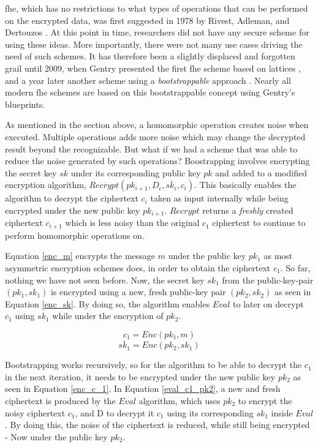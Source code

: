\Gls{fhe}, which has no restrictions to what types of operations that can be performed on the encrypted data, was first suggested in 1978 by Rivest, Adleman, and Dertouzos \cite{rivest1978data}. At this point in time, researchers did not have any secure scheme for using these ideas. More importantly, there were not many use cases driving the need of such schemes. It has therefore been a slightly displaced and forgotten grail until 2009,
when Gentry presented the first \gls{fhe} scheme based on lattices \cite{Gentry_first_lattices}, and a year later another scheme using a \emph{bootstrappable} approach \citep{Gentry_computing_arb_func_enc_data}. Nearly all modern \gls{fhe} schemes are based on this bootstrappable concept using Gentry's blueprints. 

As mentioned in the section above, a homomorphic operation creates noise when executed. Multiple operations adds more noise which may change the decrypted result beyond the recognizable. But what if we had a scheme that was able to reduce the noise generated by such operations? Boostrapping involves encrypting the secret key $sk$ under its corresponding public key $pk$ and added to a modified encryption algorithm, $Recrypt(pk_{i+1}, D_{\epsilon}, \overline{sk_i}, c_i)$. This basically enables the algorithm to decrypt the ciphertext $c_i$ taken as input internally while being encrypted under the new public key $pk_{i+1}$. $Recrypt$ returns a \emph{freshly} created ciphertext $c_{i+1}$ which is less noisy than the original $c_1$ ciphertext to continue to perform homomorphic operations on.

Equation \ref{enc_m} encrypts the message $m$ under the public key $pk_1$ as most asymmetric encryption schemes does, in order to obtain the ciphertext $c_1$. So far, nothing we have not seen before. Now, the secret key $sk_1$ from the public-key-pair $(pk_1,sk_1)$ is encrypted using a new, fresh public-key pair $(pk_2, sk_2)$ as seen in Equation \ref{enc_sk}. By doing so, the algorithm enables $Eval$ to later on decrypt $c_1$ using $sk_1$ while under the encryption of $pk_2$.

\begin{equation}
\label{enc_m}
c_1 = Enc(pk_1, m)
\end{equation}
\begin{equation}
\label{enc_sk}
\overline{sk_1} = Enc(pk_2, sk_1)
\end{equation}

Bootstrapping works recursively, so for the algorithm to be able to decrypt the $c_1$ in the next iteration, it needs to be encrypted under the new public key $pk_2$ as seen in Equation \ref{enc_c_1}. In Equation \ref{eval_c1_pk2}, a new and fresh ciphertext is produced by the $Eval$ algorithm, which uses $pk_2$ to encrypt the noisy ciphertext $c_1$, and D to decrypt it $c_1$ using its corresponding $sk_1$ inside $Eval$. By doing this, the noise of the ciphertext is reduced, while still being encrypted - Now under the public key $pk_2$. 

